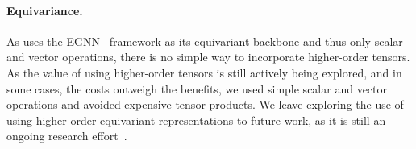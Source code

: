 \paragraph{Equivariance.} As \model uses the EGNN~\citep{EGNN} framework as its equivariant backbone and thus only scalar and vector operations, there is no simple way to incorporate higher-order tensors. As the value of using higher-order tensors is still actively being explored, and in some cases, the costs outweigh the benefits, we used simple scalar and vector operations and avoided expensive tensor products.
We leave exploring the use of using higher-order equivariant representations to future work, as it is still an ongoing research effort~\citep{equivariance-survey}.